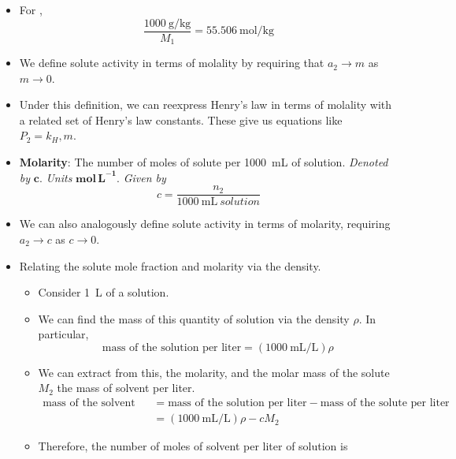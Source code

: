 \documentclass[../notes.tex]{subfiles}
\begin{document}
\begin{itemize}
\begin{itemize}
        \item We convert from the middle equation to the right equation by dividing both the top and bottom of the fraction by \SI{1000}{\gram}.
    \end{itemize}
    \item For ,
    \begin{equation*}
        \frac{\SI{1000}{\gram\per\kilo\gram}}{M_1} = \SI[per-mode=symbol]{55.506}{\mole\per\kilo\gram}
    \end{equation*}
    \item We define solute activity in terms of molality by requiring that $a_2\to m$ as $m\to 0$.
    \item Under this definition, we can reexpress Henry's law in terms of molality with a related set of Henry's law constants. These give us equations like $P_2=k_H,m$.
    \item \textbf{Molarity}: The number of moles of solute per \SI{1000}{\milli\liter} of solution. \emph{Denoted by} $\bm{c}$. \emph{Units} $\textbf{mol}\,\textbf{L}^{\bm{-1}}$. \emph{Given by}
    \begin{equation*}
        c = \frac{n_2}{\SI{1000}{\milli\liter\ solution}}
    \end{equation*}
    \item We can also analogously define solute activity in terms of molarity, requiring $a_2\to c$ as $c\to 0$.
    \item Relating the solute mole fraction and molarity via the density.
    \begin{itemize}
        \item Consider \SI{1}{\liter} of a solution.
        \item We can find the mass of this quantity of solution via the density $\rho$. In particular,
        \begin{equation*}
            \text{mass of the solution per liter} = (\SI{1000}{\milli\liter\per\liter})\rho
        \end{equation*}
        \item We can extract from this, the molarity, and the molar mass of the solute $M_2$ the mass of solvent per liter.
        \begin{align*}
            \text{mass of the solvent per liter} &= \text{mass of the solution per liter}-\text{mass of the solute per liter}\\
            &= (\SI{1000}{\milli\liter\per\liter})\rho-cM_2
        \end{align*}
        \item Therefore, the number of moles of solvent per liter of solution is

\end{itemize}
\end{itemize}
\end{document}
